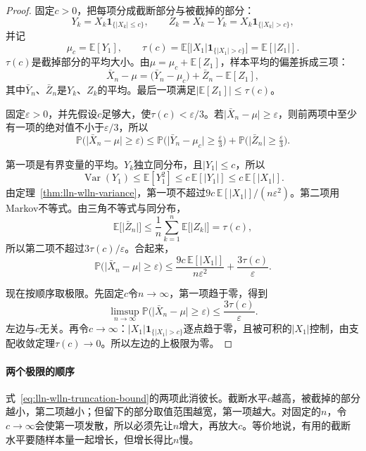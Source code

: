\begin{proof}
固定$c>0$，把每项分成截断部分与被截掉的部分：
\[
 Y_k=X_k\mathbf{1}_{\{\lvert X_k\rvert\leq c\}},\qquad Z_k=X_k-Y_k=X_k\mathbf{1}_{\{\lvert X_k\rvert>c\}} ,
\]
并记
\[
 \mu_c=\mathbb{E}[Y_1],\qquad \tau(c)=\mathbb{E}\bigl[\lvert X_1\rvert\mathbf{1}_{\{\lvert X_1\rvert>c\}}\bigr]=\mathbb{E}[\lvert Z_1\rvert] .
\]
$\tau(c)$是截掉部分的平均大小。由$\mu=\mu_c+\mathbb{E}[Z_1]$，样本平均的偏差拆成三项：
\[
 \bar{X}_n-\mu=\bigl(\bar{Y}_n-\mu_c\bigr)+\bar{Z}_n-\mathbb{E}[Z_1] ,
\]
其中$\bar{Y}_n$、$\bar{Z}_n$是$Y_k$、$Z_k$的平均。最后一项满足$\lvert\mathbb{E}[Z_1]\rvert\leq\tau(c)$。

固定$\varepsilon>0$，并先假设$c$足够大，使$\tau(c)<\varepsilon/3$。若$\lvert\bar{X}_n-\mu\rvert\geq\varepsilon$，则前两项中至少有一项的绝对值不小于$\varepsilon/3$，所以
\[
 \mathbb{P}\bigl(\lvert\bar{X}_n-\mu\rvert\geq\varepsilon\bigr)\leq\mathbb{P}\bigl(\lvert\bar{Y}_n-\mu_c\rvert\geq\tfrac{\varepsilon}{3}\bigr)+\mathbb{P}\bigl(\lvert\bar{Z}_n\rvert\geq\tfrac{\varepsilon}{3}\bigr) .
\]

第一项是有界变量的平均。$Y_k$独立同分布，且$\lvert Y_1\rvert\leq c$，所以
\[
 \operatorname{Var}(Y_1)\leq\mathbb{E}[Y_1^2]\leq c\,\mathbb{E}[\lvert Y_1\rvert]\leq c\,\mathbb{E}[\lvert X_1\rvert] .
\]
由定理~\ref{thm:lln-wlln-variance}，第一项不超过$9c\,\mathbb{E}[\lvert X_1\rvert]/(n\varepsilon^2)$。第二项用Markov不等式。由三角不等式与同分布，
\[
 \mathbb{E}\bigl[\lvert\bar{Z}_n\rvert\bigr]\leq\frac1n\sum_{k=1}^{n}\mathbb{E}\bigl[\lvert Z_k\rvert\bigr]=\tau(c) ,
\]
所以第二项不超过$3\tau(c)/\varepsilon$。合起来，
\begin{equation}
 \mathbb{P}\bigl(\lvert\bar{X}_n-\mu\rvert\geq\varepsilon\bigr)\leq\frac{9c\,\mathbb{E}[\lvert X_1\rvert]}{n\varepsilon^2}+\frac{3\tau(c)}{\varepsilon} .
 \label{eq:lln-wlln-truncation-bound}
\end{equation}

现在按顺序取极限。先固定$c$令$n\to\infty$，第一项趋于零，得到
\[
 \limsup_{n\to\infty}\mathbb{P}\bigl(\lvert\bar{X}_n-\mu\rvert\geq\varepsilon\bigr)\leq\frac{3\tau(c)}{\varepsilon} .
\]
左边与$c$无关。再令$c\to\infty$：$\lvert X_1\rvert\mathbf{1}_{\{\lvert X_1\rvert>c\}}$逐点趋于零，且被可积的$\lvert X_1\rvert$控制，由支配收敛定理$\tau(c)\to0$。所以左边的上极限为零。
\end{proof}

\paragraph{两个极限的顺序}
式~\eqref{eq:lln-wlln-truncation-bound}的两项此消彼长。截断水平$c$越高，被截掉的部分越小，第二项越小；但留下的部分取值范围越宽，第一项越大。对固定的$n$，令$c\to\infty$会使第一项发散，所以必须先让$n$增大，再放大$c$。等价地说，有用的截断水平要随样本量一起增长，但增长得比$n$慢。


